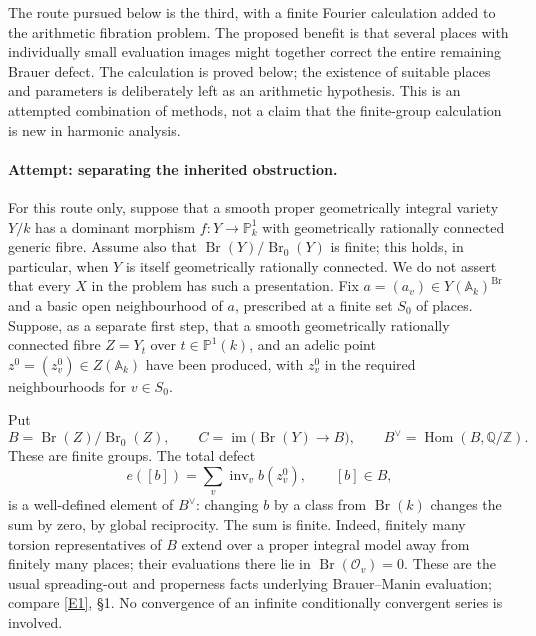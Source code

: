 \documentclass[11pt]{article}
\newcommand{\Z}{\mathbb{Z}}
\newcommand{\Q}{\mathbb{Q}}
\newcommand{\A}{\mathbb{A}}
\newcommand{\PP}{\mathbb P}
\newcommand{\eref}[2]{\hyperlink{extra:#1:#2}{[E#2]}}
\begin{document}
The route pursued below is the third, with a finite Fourier calculation added
to the arithmetic fibration problem.  The proposed benefit is that several
places with individually small evaluation images might together correct the
entire remaining Brauer defect.  The calculation is proved below; the existence
of suitable places and parameters is deliberately left as an arithmetic
hypothesis.  This is an attempted combination of methods, not a claim that
the finite-group calculation is new in harmonic analysis.

\paragraph{Attempt: separating the inherited obstruction.}
For this route only, suppose that a smooth proper geometrically integral variety $Y/k$ has a dominant
morphism $f:Y\to\PP^1_k$ with geometrically rationally connected generic fibre.
Assume also that $\operatorname{Br}(Y)/\operatorname{Br}_0(Y)$ is finite; this
holds, in particular, when $Y$ is itself geometrically rationally connected.
We do not assert that every $X$ in the problem has such a presentation.
Fix $a=(a_v)\in Y(\A_k)^{\operatorname{Br}}$ and a basic open neighbourhood of
$a$, prescribed at a finite set $S_0$ of places.  Suppose, as a separate first
step, that a smooth geometrically rationally connected fibre $Z=Y_t$ over
$t\in\PP^1(k)$, and an adelic point
$z^0=(z_v^0)\in Z(\A_k)$ have been produced, with $z_v^0$ in the required
neighbourhoods for $v\in S_0$.

Put
\[
 B=\operatorname{Br}(Z)/\operatorname{Br}_0(Z),\qquad
 C=\operatorname{im}\bigl(\operatorname{Br}(Y)\longrightarrow B\bigr),
 \qquad B^\vee=\operatorname{Hom}(B,\Q/\Z).
\]
These are finite groups.  The total defect
\begin{equation}\label{ra151:defect}
 e([b])=\sum_v\operatorname{inv}_v b(z_v^0),\qquad [b]\in B,
\end{equation}
is a well-defined element of $B^\vee$: changing $b$ by a class from
$\operatorname{Br}(k)$ changes the sum by zero, by global reciprocity.  The
sum is finite.  Indeed, finitely many torsion representatives of $B$ extend
over a proper integral model away from finitely many places; their evaluations
there lie in $\operatorname{Br}(\mathcal O_v)=0$.  These are the usual
spreading-out and properness facts underlying Brauer--Manin evaluation;
compare \eref{151}{1}, \S1.  No convergence of an infinite conditionally
convergent series is involved.
\end{document}
